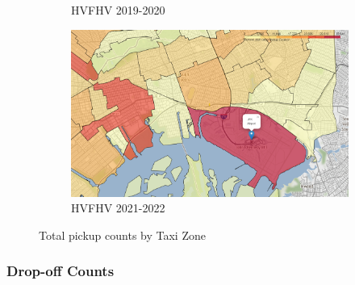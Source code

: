 \documentclass[11pt]{article}
\begin{document}
\begin{figure}
\begin{subfigure}[b]{0.4\textwidth}
        \caption[]%
        {{\small HVFHV 2019-2020}}    
        \label{}
    \end{subfigure}
    \hfill
    \begin{subfigure}[b]{0.4\textwidth}   
        \centering 
        \includegraphics[width=\textwidth]{plots/hvfhv_21_22_PULoc_geomap.png}
        \caption[]%
        {{\small HVFHV 2021-2022}}    
        \label{}
    \end{subfigure}
    \caption[]
    {\small Total pickup counts by Taxi Zone} 
    \label{}
\end{figure}

\subsubsection{Drop-off Counts}
\end{document}
